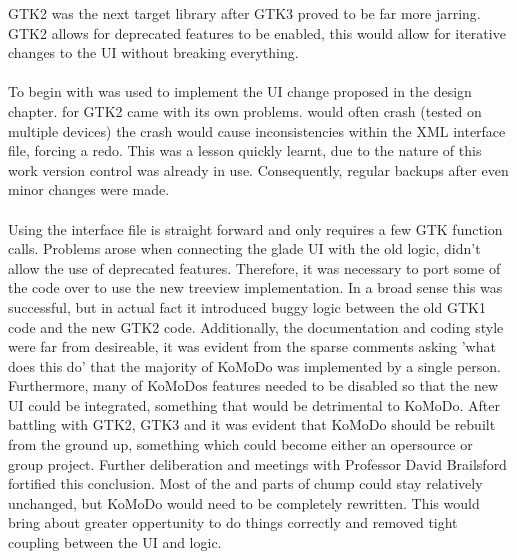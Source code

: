     GTK2 was the next target library after GTK3 proved to be far more jarring. GTK2 allows for deprecated features to be enabled, this would allow for iterative changes to the UI without breaking everything.\\\\
    To begin with  was used to implement the UI change proposed in the design chapter.  for GTK2 came with its own problems.  would often crash (tested on multiple devices) the crash would cause inconsistencies within the XML interface file, forcing a redo. This was a lesson quickly learnt, due to the nature of this work version control was already in use. Consequently, regular backups after even minor changes were made.\\\\
    Using the  interface file is straight forward and only requires a few GTK function calls. Problems arose when connecting the glade UI with the old logic,  didn't allow the use of deprecated features. Therefore, it was necessary to port some of the code over to use the new treeview implementation. In a broad sense this was successful, but in actual fact it introduced buggy logic between the old GTK1 code and the new GTK2 code. Additionally, the documentation and coding style were far from desireable, it was evident from the sparse comments asking 'what does this do' that the majority of KoMoDo was implemented by a single person. Furthermore, many of KoMoDos features needed to be disabled so that the new UI could be integrated, something that would be detrimental to KoMoDo.
    After battling with GTK2, GTK3 and  it was evident that KoMoDo should be rebuilt from the ground up, something which could become either an opersource or group project. Further deliberation and meetings with Professor David Brailsford fortified this conclusion. Most of the  and parts of chump could stay relatively unchanged, but KoMoDo would need to be completely rewritten. This would bring about greater oppertunity to do things correctly and removed tight coupling between the UI and logic.\\\\
